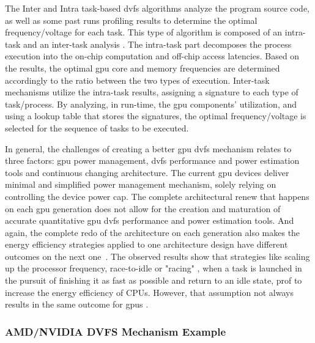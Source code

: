 The Inter and Intra task-based \acrshort{dvfs} algorithms analyze the program source code, as well as some past runs profiling results to determine the optimal frequency/voltage for each task. This type of algorithm is composed of an intra-task and an inter-task analysis \cite{noauthor_time_nodate}. The intra-task part decomposes the process execution into the on-chip computation and off-chip access latencies. Based on the results,  the optimal \acrshort{gpu} core and memory frequencies are determined accordingly to the ratio between the two types of execution. Inter-task mechanisms utilize the intra-task results, assigning a signature to each type of task/process. By analyzing, in run-time, the \acrshort{gpu} components' utilization, and using a lookup table that stores the signatures, the optimal frequency/voltage is selected for the sequence of tasks to be executed.

In general, the challenges of creating a better \acrshort{gpu} \acrshort{dvfs} mechanism relates to three factors: \acrshort{gpu} power management, \acrshort{dvfs} performance and power estimation tools and continuous changing architecture. 
The current \acrshort{gpu} devices deliver minimal and simplified power management mechanism, solely relying on controlling the device power cap. The complete architectural renew that happens on each \acrshort{gpu} generation does not allow for the creation and maturation of accurate quantitative \acrshort{gpu} \acrshort{dvfs} performance and power estimation tools. 
And again, the complete redo of the architecture on each generation also makes the energy efficiency strategies applied to one architecture design have different outcomes on the next one~\cite{mei_survey_2016}. The observed results show that strategies like scaling up the processor frequency, race-to-idle  \cite{hoffmann_racing_2013} or "racing" \cite{kim_racing_2015}, when a task is launched in the pursuit of finishing it as fast as possible and return to an idle state, prof to increase the energy efficiency of CPUs. However, that assumption not always results in the same outcome for \acrshort{gpu}s \cite{kim_racing_2015}. 

\subsubsection{AMD/NVIDIA DVFS Mechanism Example}

